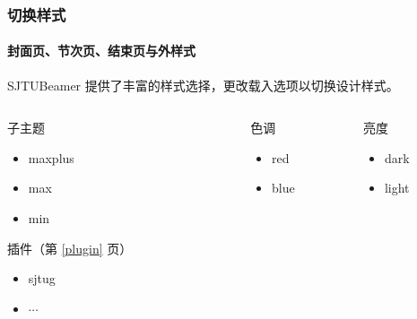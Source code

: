 \documentclass[
    aspectratio=169,  %
]{ctexbeamer}
\begin{document}
\begin{frame}
  \frametitle{切换样式}
  \framesubtitle{封面页、节次页、结束页与外样式}

  SJTUBeamer 提供了丰富的样式选择，更改载入选项以切换设计样式。

  \begin{columns}[T]
    \begin{column}{0.22\textwidth}
      \begin{alertblock}{子主题}
        \ttfamily
        \begin{itemize}
          \item maxplus
          \item max
          \item min
        \end{itemize}
      \end{alertblock}
      \begin{block}{插件（第 \ref{plugin} 页）}
        \ttfamily
        \begin{itemize}
          \item sjtug
          \item $\cdots$
        \end{itemize}
      \end{block}
    \end{column}
    \begin{column}{0.7\textwidth}
      \begin{columns}[t]
        \begin{column}{0.25\textwidth}
          \begin{alertblock}{色调}
            \ttfamily
            \begin{itemize}
              \item red
              \item blue
            \end{itemize}
          \end{alertblock}
        \end{column}
        \begin{column}{0.25\textwidth}
          \begin{alertblock}{亮度}
            \ttfamily
            \begin{itemize}
              \item dark
              \item light

\end{itemize}
\end{alertblock}
\end{column}
\end{columns}
\end{column}
\end{columns}
\end{frame}
\end{document}

